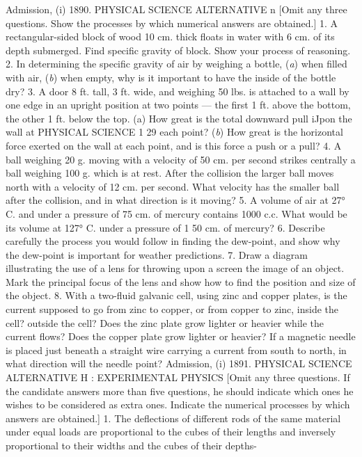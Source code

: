 Admission, (i) 1890.
PHYSICAL SCIENCE
ALTERNATIVE n
[Omit any three questions. Show the processes by which numerical answers are obtained.]
1. A rectangular-sided block of wood 10 cm. thick floats in water with 6 cm. of its depth submerged. Find specific gravity of block. Show your process of reasoning.
2. In determining the specific gravity of air by weighing a bottle, (\emph{a}) when filled with air, (\emph{b}) when empty, why is it important to have the inside of the bottle dry?
3. A door 8 ft. tall, 3 ft. wide, and weighing 50 lbs. is attached to a wall by one edge in an upright position at two points — the first 1 ft. above the bottom, the other 1 ft. below the top.
(a) How great is the total downward pull iJpon the wall at
PHYSICAL SCIENCE 1 29
each point? (\emph{b}) How great is the horizontal force exerted on the wall at each point, and is this force a push or a pull?
4. A ball weighing 20 g. moving with a velocity of 50 cm. per second strikes centrally a ball weighing 100 g. which is at rest. After the collision the larger ball moves north with a velocity of 12 cm. per second. What velocity has the smaller ball after the collision, and in what direction is it moving?
5. A volume of air at 27° C. and under a pressure of 75 cm. of mercury contains 1000 c.c. What would be its volume at 127° C. under a pressure of 1 50 cm. of mercury?
6. Describe carefully the process you would follow in finding the dew-point, and show why the dew-point is important for weather predictions.
7. Draw a diagram illustrating the use of a lens for throwing upon a screen the image of an object. Mark the principal focus of the lens and show how to find the position and size of the object.
8. With a two-fluid galvanic cell, using zinc and copper plates, is the current supposed to go from zinc to copper, or from copper to zinc, inside the cell? outside the cell? Does the zinc plate grow lighter or heavier while the current flows? Does the copper plate grow lighter or heavier? If a magnetic needle is placed just beneath a straight wire carrying a current from south to north, in what direction will the needle point?
Admission, (i) 1891.
PHYSICAL SCIENCE ALTERNATIVE H : EXPERIMENTAL PHYSICS
[Omit any three questions. If the candidate answers more than five questions, he should indicate which ones he wishes to be considered as extra ones. Indicate the numerical processes by which answers are obtained.]
1. The deflections of different rods of the same material under equal loads are proportional to the cubes of their lengths and inversely proportional to their widths and the cubes of their depths-
